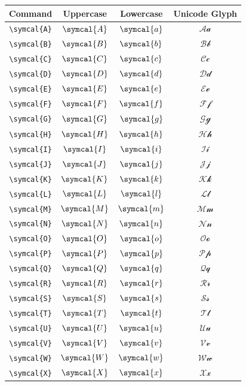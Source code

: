 \documentclass[12pt,a4paper]{article}
\begin{document}
\begin{longtable}{|c|c|c|c|}
\hline
\textbf{Command} & \textbf{Uppercase} & \textbf{Lowercase} & \textbf{Unicode Glyph} \\
\hline
\verb|\symcal{A}| & $\symcal{A}$ & $\symcal{a}$ & $ 𝒜 𝒶 $ \\
\verb|\symcal{B}| & $\symcal{B}$ & $\symcal{b}$ & $ ℬ 𝒷 $ \\
\verb|\symcal{C}| & $\symcal{C}$ & $\symcal{c}$ & $ 𝒞 𝒸 $ \\
\verb|\symcal{D}| & $\symcal{D}$ & $\symcal{d}$ & $ 𝒟 𝒹 $ \\
\verb|\symcal{E}| & $\symcal{E}$ & $\symcal{e}$ & $ ℰ ℯ $ \\
\verb|\symcal{F}| & $\symcal{F}$ & $\symcal{f}$ & $ ℱ 𝒻 $ \\
\verb|\symcal{G}| & $\symcal{G}$ & $\symcal{g}$ & $ 𝒢 ℊ $ \\
\verb|\symcal{H}| & $\symcal{H}$ & $\symcal{h}$ & $ ℋ 𝒽 $ \\
\verb|\symcal{I}| & $\symcal{I}$ & $\symcal{i}$ & $ ℐ 𝒾 $ \\
\verb|\symcal{J}| & $\symcal{J}$ & $\symcal{j}$ & $ 𝒥 𝒿 $ \\
\verb|\symcal{K}| & $\symcal{K}$ & $\symcal{k}$ & $ 𝒦 𝓀 $ \\
\verb|\symcal{L}| & $\symcal{L}$ & $\symcal{l}$ & $ ℒ 𝓁 $ \\
\verb|\symcal{M}| & $\symcal{M}$ & $\symcal{m}$ & $ ℳ 𝓂 $ \\
\verb|\symcal{N}| & $\symcal{N}$ & $\symcal{n}$ & $ 𝒩 𝓃 $ \\
\verb|\symcal{O}| & $\symcal{O}$ & $\symcal{o}$ & $ 𝒪 ℴ $ \\
\verb|\symcal{P}| & $\symcal{P}$ & $\symcal{p}$ & $ 𝒫 𝓅 $ \\
\verb|\symcal{Q}| & $\symcal{Q}$ & $\symcal{q}$ & $ 𝒬 𝓆 $ \\
\verb|\symcal{R}| & $\symcal{R}$ & $\symcal{r}$ & $ ℛ 𝓇 $ \\
\verb|\symcal{S}| & $\symcal{S}$ & $\symcal{s}$ & $ 𝒮 𝓈 $ \\
\verb|\symcal{T}| & $\symcal{T}$ & $\symcal{t}$ & $ 𝒯 𝓉 $ \\
\verb|\symcal{U}| & $\symcal{U}$ & $\symcal{u}$ & $ 𝒰 𝓊 $ \\
\verb|\symcal{V}| & $\symcal{V}$ & $\symcal{v}$ & $ 𝒱 𝓋 $ \\
\verb|\symcal{W}| & $\symcal{W}$ & $\symcal{w}$ & $ 𝒲 𝓌 $ \\
\verb|\symcal{X}| & $\symcal{X}$ & $\symcal{x}$ & $ 𝒳 𝓍 $ \\

\end{longtable}
\end{document}
